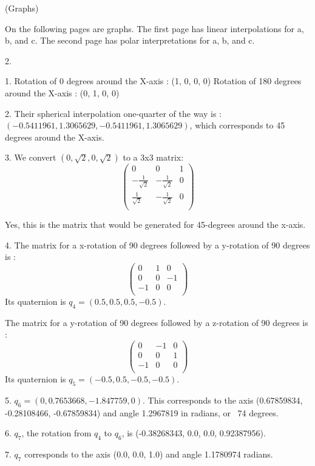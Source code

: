 \documentclass{letter}
\begin{document}
(Graphs)

On the following pages are graphs. The first page has linear interpolations for a, b, and c. The second page has polar interpretations for a, b, and c. 



 

2. 

1. 
Rotation of 0 degrees around the X-axis : (1, 0, 0, 0)
Rotation of 180 degrees around the X-axis : (0, 1, 0, 0)

2.
Their spherical interpolation one-quarter of the way is : $(-0.5411961, 1.3065629, -0.5411961, 1.3065629)$, which corresponds to 45 degrees around the X-axis. 

3.
We convert $(0, \sqrt{2}, 0, \sqrt{2})$ to a 3x3 matrix:
$$\begin{pmatrix}
0 & 0 & 1 \\
-\frac{1}{\sqrt{2}} & -\frac{1}{\sqrt{2}} & 0 \\
\frac{1}{\sqrt{2}} & -\frac{1}{\sqrt{2}} & 0 \\
\end{pmatrix}$$

Yes, this is the matrix that would be generated for 45-degrees around the x-axis. 

4. The matrix for a x-rotation of 90 degrees followed by a y-rotation of 90 degrees is :
$$\begin{pmatrix}
0 & 1 & 0 \\
0 & 0 & -1 \\
-1 & 0 & 0 \\
\end{pmatrix}$$
Its quaternion is $q_4 = (0.5, 0.5, 0.5, -0.5)$.

The  matrix for a y-rotation of 90 degrees followed by a z-rotation of 90 degrees is :
$$\begin{pmatrix}
0 & -1 & 0 \\
0 & 0 & 1 \\
-1 & 0 & 0 \\
\end{pmatrix}$$
Its quaternion is $q_5 = (-0.5, 0.5, -0.5, -0.5)$.

5. $q_6 = (0, 0.7653668, -1.847759, 0)$. This corresponds to the axis (0.67859834, -0.28108466, -0.67859834) and angle 1.2967819 in radians, or ~74 degrees.

6. $q_7$, the rotation from $q_4$ to $q_6$, is (-0.38268343, 0.0, 0.0, 0.92387956). 

7. $q_7$ corresponds to the axis (0.0, 0.0, 1.0) and angle 1.1780974 radians. 
\end{document}
